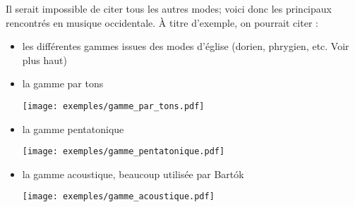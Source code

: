 \documentclass[11pt]{scrreprt}
\begin{document}
Il serait impossible de citer tous les autres modes; voici donc les principaux rencontrés en musique occidentale.
À titre d'exemple, on pourrait citer :
\begin{itemize}
\item les différentes gammes issues des modes d'église (dorien, phrygien, etc. Voir plus haut)
\item la gamme par tons
\begin{center}
   \texttt{[image: exemples/gamme\_par\_tons.pdf]}
\end{center}
\item la gamme pentatonique
\begin{center}
   \texttt{[image: exemples/gamme\_pentatonique.pdf]}
\end{center}
\item la gamme acoustique, beaucoup utilisée par Bartók
\begin{center}
   \texttt{[image: exemples/gamme\_acoustique.pdf]}
\end{center}
\end{itemize}
\end{document}
